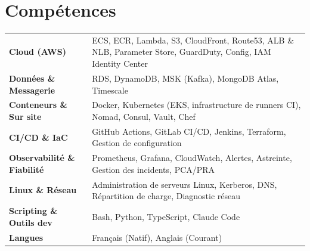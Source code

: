 
\section{Compétences}
\renewcommand{\arraystretch}{1.25}
\begin{tabularx}{\linewidth}{@{}l X@{}}
\textbf{Cloud (AWS)} &  \small{ECS, ECR, Lambda, S3, CloudFront, Route53, ALB \& NLB, Parameter Store, GuardDuty, Config, IAM Identity Center}\\
\textbf{Données \& Messagerie} &  \small{RDS, DynamoDB, MSK (Kafka), MongoDB Atlas, Timescale}\\
\textbf{Conteneurs \& Sur site} &  \small{Docker, Kubernetes (EKS, infrastructure de runners CI), Nomad, Consul, Vault, Chef}\\
\textbf{CI/CD \& IaC}  &  \small{GitHub Actions, GitLab CI/CD, Jenkins, Terraform, Gestion de configuration}\\
\textbf{Observabilité \& Fiabilité} &  \small{Prometheus, Grafana, CloudWatch, Alertes, Astreinte, Gestion des incidents, PCA/PRA}\\
\textbf{Linux \& Réseau} &  \small{Administration de serveurs Linux, Kerberos, DNS, Répartition de charge, Diagnostic réseau}\\
\textbf{Scripting \& Outils dev}  &  \small{Bash, Python, TypeScript, Claude Code}\\
\textbf{Langues} &  \small{Français (Natif), Anglais (Courant)}\\
\end{tabularx}
\renewcommand{\arraystretch}{1}
